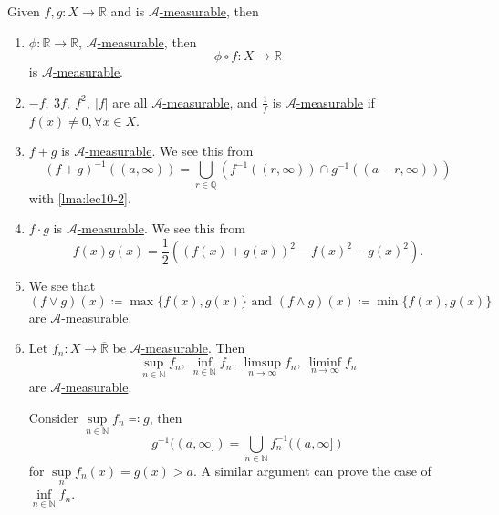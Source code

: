 \begin{remark}\label{rmk:Operations-preserve-measurability}
	Given \(f, g\colon X\to \mathbb{R} \) and is \hyperref[def:A-measurable-function]{\(\mathcal{A}\)-measurable}, then
	\begin{enumerate}[(1)]
		\item \(\phi \colon \mathbb{R} \to \mathbb{R} \), \hyperref[def:A-measurable-function]{\(\mathcal{A}\)-measurable}, then
		      \[
			      \phi \circ f\colon X\to \mathbb{R}
		      \]
		      is \hyperref[def:A-measurable-function]{\(\mathcal{A}\)-measurable}.
		\item \(-f,\ 3f,\ f^2,\ \left\vert f \right\vert \) are all \hyperref[def:A-measurable-function]{\(\mathcal{A} \)-measurable}, and \(\frac{1}{f}\) is
		      \hyperref[def:A-measurable-function]{\(\mathcal{A}\)-measurable} if \(f(x)\neq 0, \forall x\in X\).
		\item \(f+g\) is \hyperref[def:A-measurable-function]{\(\mathcal{A}\)-measurable}. We see this from
		      \[
			      (f+g)^{-1} ((a, \infty ))=\bigcup\limits_{r\in\mathbb{Q}} \left(f^{-1} ((r, \infty ))\cap g^{-1} ((a-r, \infty ))\right)
		      \]
		      with \autoref{lma:lec10-2}.
		\item \(f\cdot g\) is \hyperref[def:A-measurable-function]{\(\mathcal{A}\)-measurable}. We see this from
		      \[
			      f(x)g(x) = \frac{1}{2}\left((f(x)+g(x))^2 - f(x)^2 - g(x)^2\right).
		      \]
		\item We see that
		      \[
			      (f\vee g)(x)\coloneqq \max \{f(x), g(x)\}\text{ and }(f\wedge g)(x)\coloneqq \min\{f(x), g(x)\}
		      \]
		      are \hyperref[def:A-measurable-function]{\(\mathcal{A}\)-measurable}.
		\item Let \(f_{n}\colon X\to \overline{\mathbb{R} }\) be \hyperref[def:A-measurable-function]{\(\mathcal{A}\)-measurable}. Then
		      \[
			      \sup\limits_{n\in\mathbb{N} } f_{n},\ \inf\limits_{n\in\mathbb{N} } f_{n},\ \limsup\limits_{n\to \infty} f_{n},\ \liminf\limits_{n\to \infty} f_{n}
		      \]
		      are \hyperref[def:A-measurable-function]{\(\mathcal{A}\)-measurable}.
		      \begin{explanation}
			      Consider \(\sup\limits_{n\in\mathbb{N} } f_{n} \eqqcolon g\), then
			      \[
				      g^{-1} ((a, \infty ]) = \bigcup\limits_{n\in\mathbb{N}} f_{n}^{-1} ((a, \infty ])
			      \]
			      for \(\sup\limits_n f_{n}(x) = g(x)>a\). A similar argument can prove the case of \(\inf\limits_{n\in\mathbb{N} } f_{n}\).


\end{explanation}
\end{enumerate}
\end{remark}
